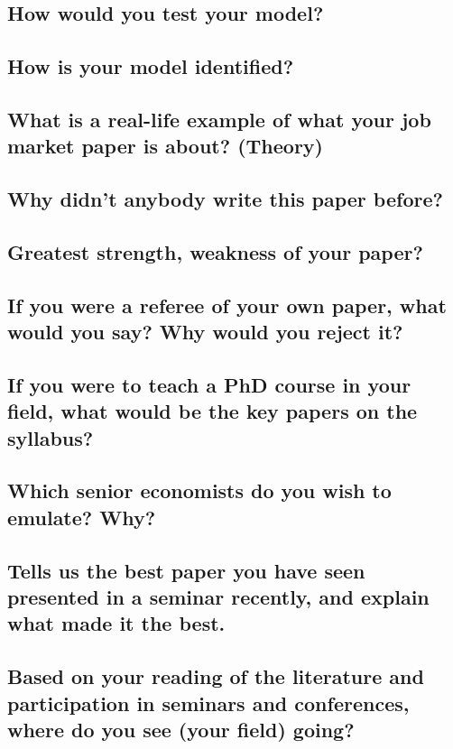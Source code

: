 \documentclass[12pt]{article}
\theoremstyle{plain}
\theoremstyle{plain}
\theoremstyle{plain}
\theoremstyle{plain}
\theoremstyle{plain}
\theoremstyle{plain}
\begin{document}
\subsection{How would you test your model?}
\label{sec:org97f8a4b}
\subsection{How is your model identified?}
\label{sec:org7dc9483}
\subsection{What is a real-life example of what your job market paper is about? (Theory)}
\label{sec:org64578e1}
\subsection{Why didn't anybody write this paper before?}
\label{sec:orgd745f9f}
\subsection{Greatest strength, weakness of your paper?}
\label{sec:org4b7843f}
\subsection{If you were a referee of your own paper, what would you say? Why would you reject it?}
\label{sec:org1d182cd}
\subsection{If you were to teach a PhD course in your field, what would be the key papers on the syllabus?}
\label{sec:orgb01966e}
\subsection{Which senior economists do you wish to emulate? Why?}
\label{sec:orgb034e2c}
\subsection{Tells us the best paper you have seen presented in a seminar recently, and explain what made it the best.}
\label{sec:org99942b8}
\subsection{Based on your reading of the literature and participation in seminars and conferences, where do you see (your field) going?}
\label{sec:orgb30d502}
\end{document}
